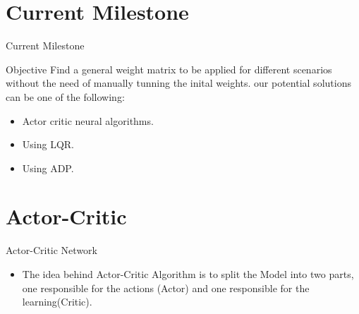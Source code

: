\documentclass{beamer}
\begin{document}
\section{Current Milestone}
\begin{frame}{Current Milestone}
\begin{block}{Objective}
Find a general weight matrix to be applied for different scenarios without the need of manually tunning the inital weights. our potential solutions can be one of the following:
\begin{itemize}
\item  Actor critic neural algorithms. 
\item Using LQR.
\item Using ADP.
\end{itemize}
\end{block}
\end{frame}
\section{Actor-Critic}
\begin{frame}{Actor-Critic Network}
\begin{block}{}
\begin{itemize}
\item The idea behind Actor-Critic Algorithm is to split the Model into two parts, one responsible for the actions (Actor) and one responsible for the learning(Critic).
\end{itemize}
\end{block}
\end{frame}
\end{document}
